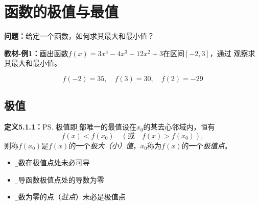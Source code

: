 \section{函数的极值与最值}

{\bf 问题：}给定一个函数，如何求其最大和最小值？

{\bf 教材-例1：}画出函数$f(x)=3x^4-4x^3-12x^2+3$在区间$[-2,3]$，通过
观察求其最大和最小值。

\begin{center}
\end{center}
\vspace{-2em}
$$f(-2)=35,\quad f(3)=30,\quad f(2)=-29$$



\subsection{极值}

{\bf 定义5.1.1：}\ps{极值即{\b 局部唯一的最值}}设在$x_0$的某去心邻域内，恒有
$$f(x)<f(x_0)\quad (\mbox{或}\quad f(x)>f(x_0)),$$
则称$f(x_0)$是$f(x)$的一个{\it 极大（小）值}，$x_0$称为$f(x)$的一个{\it 极值点}。

\begin{itemize}
  \setlength{\itemindent}{1cm}
  \item {\b 函数在极值点处未必可导} 
  \item {\b 可导函数极值点处的导数为零} 
  \item {\b 导数为零的点（{\it 驻点}）未必是极值点}
\end{itemize}

\begin{center}
\end{center}


